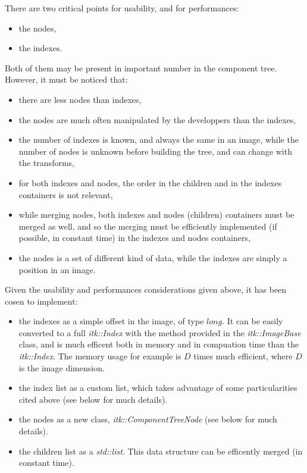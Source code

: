 \documentclass{InsightArticle}
\begin{document}
There are two critical points for usability, and for performances:
\begin{itemize}
  \item the nodes,
  \item the indexes.
\end{itemize}
Both of them may be present in important number in the component tree. However, it must be noticed that:
\begin{itemize}
  \item there are less nodes than indexes,
  \item the nodes are much often manipulated by the developpers than the indexes,
  \item the number of indexes is known, and always the same in an image, while the number of nodes is unknown before building the tree, and can change with the transforms,
  \item for both indexes and nodes, the order in the children and in the indexes containers is not relevant,
  \item while merging nodes, both indexes and nodes (children) containers must be merged as well, and so the merging must be efficiently implemented (if possible, in constant time) in the indexes and nodes containers,
  \item the nodes is a set of different kind of data, while the indexes are simply a position in an image.
\end{itemize}

Given the usability and performances considerations given above, it has been cosen to implement:
\begin{itemize}
  \item the indexes as a simple offset in the image, of type $long$. It can be easily converted to a full {\em itk::Index} with the method provided in the {\em itk::ImageBase} class, and is much efficent both in memory and in compuation time than the {\em itk::Index}. The memory usage for example is $D$ times much efficient, where $D$ is the image dimension.
  \item the index list as a custom list, which takes advantage of some particularities cited above (see below for much details).
  \item the nodes as a new class, {\em itk::ComponentTreeNode} (see below for much details).
  \item the children list as a {\em std::list}. This data structure can be efficently merged (in constant time).
\end{itemize}
\end{document}
